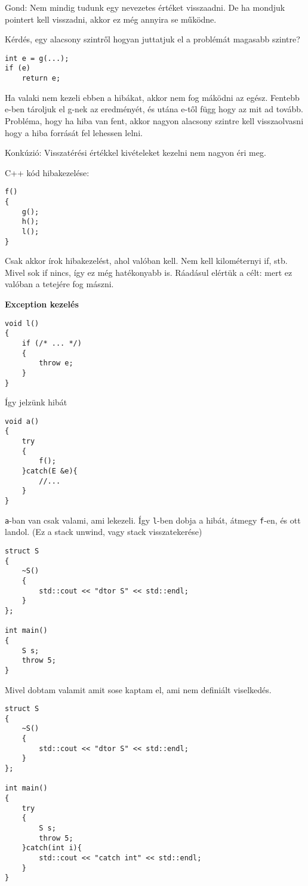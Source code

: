 \documentclass[a4paper,11.5pt]{article}
\begin{document}
		Gond: Nem mindig tudunk egy nevezetes értéket visszaadni. De ha mondjuk pointert kell visszadni, akkor ez még annyira se működne. 
		
		Kérdés, egy alacsony szintről hogyan juttatjuk el a problémát magasabb szintre?
		
		\begin{lstlisting}
int e = g(...);
if (e)
	return e;
		\end{lstlisting}
		
		Ha valaki nem kezeli ebben a hibákat, akkor nem fog máködni az egész. Fentebb e-ben tároljuk el g-nek az eredményét, és utána e-től függ hogy az mit ad tovább. Probléma, hogy ha hiba van fent, akkor nagyon alacsony szintre kell visszaolvasni hogy a hiba forrását fel lehessen lelni.
		
		Konkúzió: Visszatérési értékkel kivételeket kezelni nem nagyon éri meg.
		
		C++ kód hibakezelése:
		
		\begin{lstlisting}
f()
{
	g();
	h();
	l();
}
		\end{lstlisting}
		
		Csak akkor írok hibakezelést, ahol valóban kell. Nem kell kilométernyi if, stb. Mivel sok if nincs, így ez még hatékonyabb is. Ráadásul elértük a célt: mert ez valóban a tetejére fog mászni.
		
		\textbf{Exception kezelés}
		
		\begin{lstlisting}
void l()
{
	if (/* ... */)
	{
		throw e;
	}
}
		\end{lstlisting}
		
		Így jelzünk hibát
		
		\begin{lstlisting}
void a()
{
	try
	{
		f();
	}catch(E &e){
		//...	
	}
}
		\end{lstlisting}
		\texttt{a}-ban van csak valami, ami lekezeli. Így \texttt{l}-ben dobja a hibát, átmegy \texttt{f}-en, és ott landol. (Ez a stack unwind, vagy stack visszatekerése)
		
		\begin{lstlisting}
struct S
{
	~S()
	{
		std::cout << "dtor S" << std::endl;
	}
};

int main()
{
	S s;
	throw 5;
}
		\end{lstlisting}
		Mivel dobtam valamit amit sose kaptam el, ami nem definiált viselkedés.
		\begin{lstlisting}
struct S
{
	~S()
	{
		std::cout << "dtor S" << std::endl;
	}
};

int main()
{
	try
	{
		S s;
		throw 5;
	}catch(int i){
		std::cout << "catch int" << std::endl;
	}
}
		\end{lstlisting}
		
\end{document}
